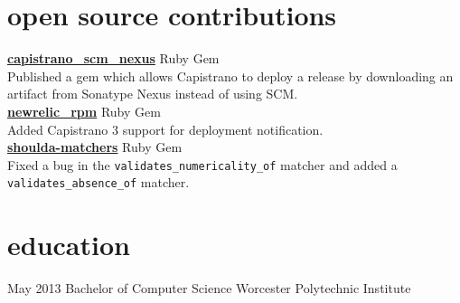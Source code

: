 \documentclass[]{friggeri-cv}
\begin{document}
\section{open source contributions}

{\href{https://github.com/jmpage/capistrano_scm_nexus}{\textbf{capistrano\_scm\_nexus}}} \hfill {\footnotesize{} Ruby Gem} \\
Published a gem which allows Capistrano to deploy a release by downloading an artifact from Sonatype Nexus instead of using SCM.\\
{\href{https://github.com/newrelic/rpm}{\textbf{newrelic\_rpm}}} \hfill {\footnotesize{} Ruby Gem} \\
Added Capistrano 3 support for deployment notification.\\
{\href{https://github.com/thoughtbot/shoulda-matchers}{\textbf{shoulda-matchers}}} \hfill {\footnotesize{} Ruby Gem} \\
Fixed a bug in the \verb|validates_numericality_of| matcher and added a \verb|validates_absence_of| matcher.

\section{education}

\begin{entrylist}
  \entryoneline
    {May 2013}
    {Bachelor {\normalfont of Computer Science}}
    {Worcester Polytechnic Institute}
\end{entrylist}
\end{document}
